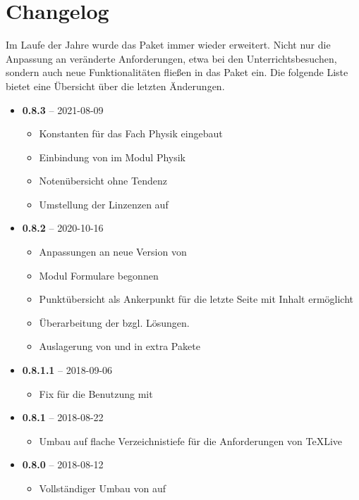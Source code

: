 \section{Changelog}
Im Laufe der Jahre wurde das Paket immer wieder erweitert. Nicht nur die Anpassung an veränderte Anforderungen, etwa bei den Unterrichtsbesuchen, sondern auch neue Funktionalitäten fließen in das Paket ein.
Die folgende Liste bietet eine Übersicht über die letzten Änderungen.
\begin{itemize}
    \item \textbf{0.8.3} -- 2021-08-09
      \begin{itemize}
       \item Konstanten für das Fach Physik eingebaut
       \item Einbindung von  im Modul Physik
       \item Notenübersicht ohne Tendenz
       \item Umstellung der Linzenzen auf 
      \end{itemize}
    \item \textbf{0.8.2} -- 2020-10-16
      \begin{itemize}
        \item Anpassungen an neue Version von 
        \item Modul Formulare begonnen
        \item Punktübersicht als Ankerpunkt für die letzte Seite mit Inhalt ermöglicht
        \item Überarbeitung der  bzgl. Lösungen.
        \item Auslagerung von  und  in extra Pakete
      \end{itemize}
  \item \textbf{0.8.1.1} -- 2018-09-06
      \begin{itemize}
        \item Fix für die Benutzung mit 
      \end{itemize}
  \item \textbf{0.8.1} -- 2018-08-22
      \begin{itemize}
        \item Umbau auf flache Verzeichnistiefe für die Anforderungen von TeXLive
      \end{itemize}
  \item \textbf{0.8.0} -- 2018-08-12
      \begin{itemize}
        \item Vollständiger Umbau von  auf 

\end{itemize}
\end{itemize}
